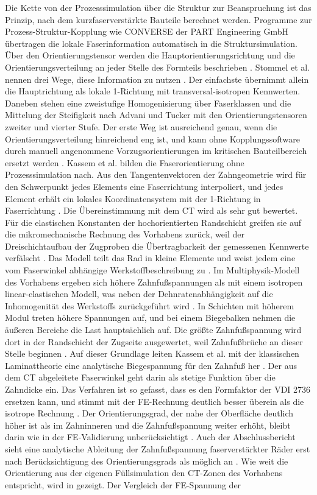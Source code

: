 Die Kette von der Prozesssimulation über die Struktur zur Beanspruchung ist das Prinzip, nach dem kurzfaserverstärkte Bauteile berechnet werden. Programme zur Prozess-Struktur-Kopplung wie CONVERSE der PART Engineering GmbH übertragen die lokale Faserinformation automatisch in die Struktursimulation. Über den Orientierungstensor werden die Hauptorientierungsrichtung und die Orientierungsverteilung an jeder Stelle des Formteils beschrieben \cite[S.~86]{Sto18}. Stommel et al. nennen drei Wege, diese Information zu nutzen \cite[S.~87 f.]{Sto18}. Der einfachste übernimmt allein die Hauptrichtung als lokale 1-Richtung mit transversal-isotropen Kennwerten. Daneben stehen eine zweistufige Homogenisierung über Faserklassen und die Mittelung der Steifigkeit nach Advani und Tucker mit den Orientierungstensoren zweiter und vierter Stufe. Der erste Weg ist ausreichend genau, wenn die Orientierungsverteilung hinreichend eng ist, und kann ohne Kopplungssoftware durch manuell angenommene Vorzugsorientierungen im kritischen Bauteilbereich ersetzt werden \cite[S.~87]{Sto18}. Kassem et al. bilden die Faserorientierung ohne Prozesssimulation nach. Aus den Tangentenvektoren der Zahngeometrie wird für den Schwerpunkt jedes Elements eine Faserrichtung interpoliert, und jedes Element erhält ein lokales Koordinatensystem mit der 1-Richtung in Faserrichtung \cite[S.~10]{Kas22}. Die Übereinstimmung mit dem CT wird als sehr gut bewertet. Für die elastischen Konstanten der hochorientierten Randschicht greifen sie auf die mikromechanische Rechnung des Vorhabens zurück, weil der Dreischichtaufbau der Zugproben die Übertragbarkeit der gemessenen Kennwerte verfälscht \cite[S.~11]{Kas22}. Das Modell teilt das Rad in kleine Elemente und weist jedem eine vom Faserwinkel abhängige Werkstoffbeschreibung zu \cite[S.~2593]{Kas23}. Im Multiphysik-Modell des Vorhabens ergeben sich höhere Zahnfußspannungen als mit einem isotropen linear-elastischen Modell, was neben der Dehnratenabhängigkeit auf die Inhomogenität des Werkstoffs zurückgeführt wird \cite[S.~128]{FVA856-I}. In Schichten mit höherem Modul treten höhere Spannungen auf, und bei einem Biegebalken nehmen die äußeren Bereiche die Last hauptsächlich auf. Die größte Zahnfußspannung wird dort in der Randschicht der Zugseite ausgewertet, weil Zahnfußbrüche an dieser Stelle beginnen \cite[S.~129]{FVA856-I}. Auf dieser Grundlage leiten Kassem et al. mit der klassischen Laminattheorie eine analytische Biegespannung für den Zahnfuß her \cite{Kas24}. Der aus dem CT abgeleitete Faserwinkel geht darin als stetige Funktion über die Zahndicke ein. Das Verfahren ist so gefasst, dass es den Formfaktor der VDI 2736 ersetzen kann, und stimmt mit der FE-Rechnung deutlich besser überein als die isotrope Rechnung \cite{Kas24}. Der Orientierungsgrad, der nahe der Oberfläche deutlich höher ist als im Zahninneren und die Zahnfußspannung weiter erhöht, bleibt darin wie in der FE-Validierung unberücksichtigt \cite{Kas24}. Auch der Abschlussbericht sieht eine analytische Ableitung der Zahnfußspannung faserverstärkter Räder erst nach Berücksichtigung des Orientierungsgrads als möglich an \cite[S.~122]{FVA856-I}. Wie weit die Orientierung aus der eigenen Füllsimulation den CT-Zonen des Vorhabens entspricht, wird in  gezeigt. Der Vergleich der FE-Spannung der 